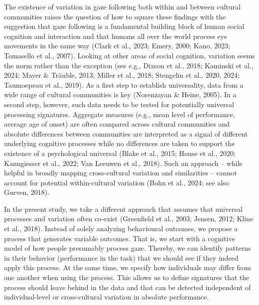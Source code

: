 \documentclass[
  man,floatsintext]{apa7}
\begin{document}
The existence of variation in gaze following both within and between cultural communities raises the question of how to square these findings with the suggestion that gaze following is a fundamental building block of human social cognition and interaction and that humans all over the world process eye movements in the same way (Clark et al., 2023; Emery, 2000; Kano, 2023; Tomasello et al., 2007). Looking at other areas of social cognition, variation seems the norm rather than the exception (see e.g., Dixson et al., 2018; Kaminski et al., 2024; Mayer \& Träuble, 2013; Miller et al., 2018; Stengelin et al., 2020, 2024; Taumoepeau et al., 2019). As a first step to establish universality, data from a wide range of cultural communities is key (Norenzayan \& Heine, 2005). In a second step, however, such data needs to be tested for potentially universal processing signatures. Aggregate measures (e.g., mean level of performance, average age of onset) are often compared across cultural communities and absolute differences between communities are interpreted as a signal of different underlying cognitive processes while no differences are taken to support the existence of a psychological universal (Blake et al., 2015; House et al., 2020; Kanngiesser et al., 2022; Van Leeuwen et al., 2018). Such an approach -- while helpful in broadly mapping cross-cultural variation and similarities -- cannot account for potential within-cultural variation (Bohn et al., 2024; see also Gurven, 2018).

In the present study, we take a different approach that assumes that universal processes and variation often co-exist (Greenfield et al., 2003; Jensen, 2012; Kline et al., 2018). Instead of solely analyzing behavioural outcomes, we propose a process that generates variable outcomes. That is, we start with a cognitive model of how people presumably process gaze. Thereby, we can identify patterns in their behavior (performance in the task) that we should see if they indeed apply this process. At the same time, we specify how individuals may differ from one another when using the process. This allows us to define signatures that the process should leave behind in the data and that can be detected independent of individual-level or cross-cultural variation in absolute performance.
\end{document}
